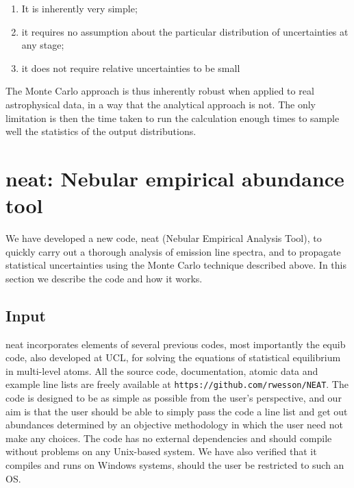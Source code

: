 \documentclass[useAMS,usenatbib]{mn2e}
\begin{document}
\begin{enumerate}
  \item It is inherently very simple;
  \item it requires no assumption about the particular distribution of uncertainties at any stage;
  \item it does not require relative uncertainties to be small
\end{enumerate}

The Monte Carlo approach is thus inherently robust when applied to real astrophysical data, in a way that the analytical approach is not.  The only limitation is then the time taken to run the calculation enough times to sample well the statistics of the output distributions.

\section{{\sc neat}: Nebular empirical abundance tool}

We have developed a new code, {\sc neat} (Nebular Empirical Analysis Tool), to quickly carry out a thorough analysis of emission line spectra, and to propagate statistical uncertainties using the Monte Carlo technique described above.  In this section we describe the code and how it works.

\subsection{Input}

{\sc neat} incorporates elements of several previous codes, most importantly the {\sc equib} code, also developed at UCL, for solving the equations of statistical equilibrium in multi-level atoms.  All the source code, documentation, atomic data and example line lists are freely available at \texttt{https://github.com/rwesson/NEAT}.  The code is designed to be as simple as possible from the user's perspective, and our aim is that the user should be able to simply pass the code a line list and get out abundances determined by an objective methodology in which the user need not make any choices.  The code has no external dependencies and should compile without problems on any Unix-based system.  We have also verified that it compiles and runs on Windows systems, should the user be restricted to such an OS.
\end{document}
